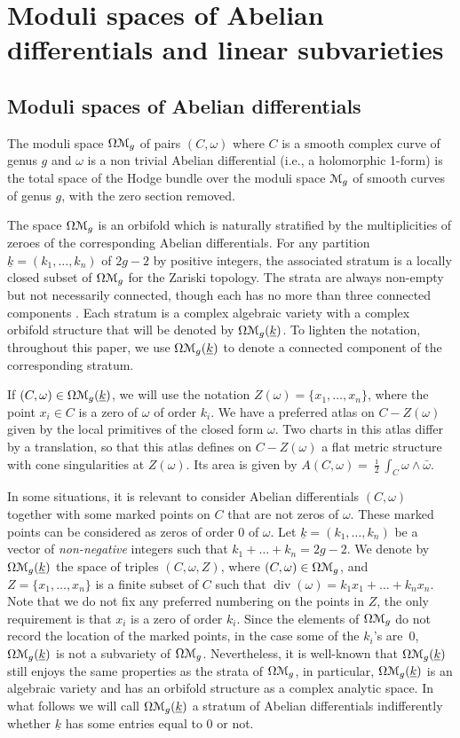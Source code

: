 \documentclass[11pt]{article}
\newcommand{\ie}{i.e.,\xspace}
\numberwithin{equation}{section}
\let\mathcal\EuScript
\DeclareMathOperator{\Div}{div}
\theoremstyle{plain}
\theoremstyle{definition}
\newcommand{\Mcal}{\mathcal{M}}
\newcommand{\cM}{\mathcal{M}}
\let\omg\omega
\let\ul\underline
\newcommand{\trate}{\Omega\Mcal_{g}(\ul{k})}
\newcommand{\htrate}{\Omega\Mcal_{g}}
\begin{document}
\section{Moduli spaces of Abelian differentials and linear subvarieties}\label{sec:strate:n:lin:subvar}
\subsection{Moduli spaces of Abelian differentials}\label{subsec:strate:abel}
The moduli space $\htrate$ of pairs $(C, \omega)$ where $C$ is a smooth complex curve of genus $g$ and $\omega$ is a non trivial Abelian differential (\ie a holomorphic 1-form) is the total space of the Hodge bundle over the moduli space $\cM_g$ of smooth curves of genus $g$, with the zero section removed.

The space $\htrate$ is an orbifold which is naturally stratified by the multiplicities of zeroes of the corresponding Abelian differentials. For any partition $\underline k=(k_1,\dots,k_n)$ of $ 2g - 2$ by positive integers, the associated stratum is a locally closed subset of $\htrate$ for the Zariski topology. The strata are always non-empty but not necessarily connected, though each has no more than three connected components \cite{KZ03}. Each stratum is a complex algebraic variety with a complex orbifold structure that will be denoted by $\trate$. To lighten the notation, throughout this paper, we use $\trate$ to denote a connected component of the corresponding stratum.

If $(C,\omega)\in\trate$, we will use the notation $Z(\omega)=\{x_1,\dots,x_n\}$, where the point $x_i\in C$ is a zero of $\omega$ of order $k_i$. We have a preferred atlas on $C - Z(\omega)$ given by the local primitives of the closed form $\omega$. Two charts in this atlas differ by a translation, so that this atlas defines on $C - Z(\omega)$ a flat metric structure with cone singularities at $Z(\omega)$. Its area is given by $A(C, \omega) = \frac{\imath}{2} \int_C \omega \wedge \bar \omega$.

In some situations, it is relevant to consider Abelian differentials $(C,\omg)$ together with some marked points on $C$ that are not zeros of $\omg$. These marked points can be considered as zeros of order $0$ of $\omg$. Let $\ul{k}=(k_1,\dots,k_n)$ be a vector of \emph{non-negative} integers such that $k_1+\dots+k_n=2g-2$. We denote by $\trate$ the space of triples $(C,\omg,Z)$, where $(C,\omg)\in \htrate$, and $Z=\{x_1,\dots,x_n\}$ is a finite subset of $C$ such that $\Div(\omg)=k_1x_1+\dots+k_nx_n$. Note that we do not fix any preferred numbering on the points in $Z$, the only requirement is that $x_i$ is a zero of order $k_i$.
Since the elements of $\htrate$ do not record the location of the marked points, in the case some of the $k_i$'s are~$0$, $\trate$ is not a subvariety of $\htrate$.
Nevertheless, it is well-known that $\trate$ still enjoys the same properties as the strata of $\htrate$, in particular, $\trate$ is an algebraic variety and has an orbifold structure as a complex analytic space.
In what follows we will call $\trate$ a stratum of Abelian differentials indifferently whether $\ul{k}$ has some entries equal to $0$ or not.\enlargethispage{.5\baselineskip}%
\end{document}
